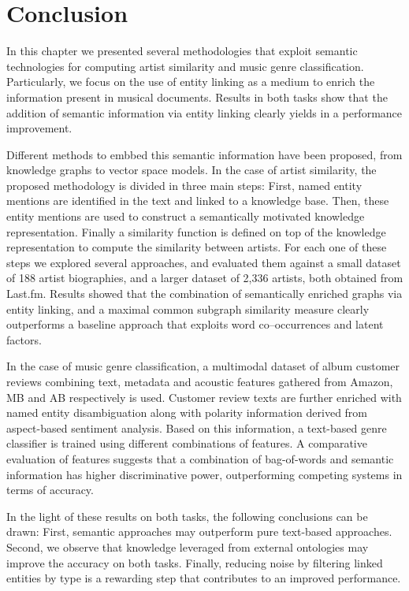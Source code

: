 \section{Conclusion}
\label{sec:similarity:conclusion}

In this chapter we presented several methodologies that exploit semantic technologies for computing artist similarity and music genre classification. Particularly, we focus on the use of entity linking as a medium to enrich the information present in musical documents. Results in both tasks show that the addition of semantic information via entity linking clearly yields in a performance improvement.

Different methods to embbed this semantic information have been proposed, from knowledge graphs to vector space models.
In the case of artist similarity, the proposed methodology is divided in three main steps: First, named entity mentions are identified in the text and linked to a knowledge base. Then, these entity mentions are used to construct a semantically motivated knowledge representation. Finally a similarity function is defined on top of the knowledge representation to compute the similarity between artists.
For each one of these steps we explored several approaches, and evaluated them against a small dataset of 188 artist biographies, and a larger dataset of 2,336 artists, both obtained from Last.fm.
Results showed that the combination of semantically enriched graphs via entity linking, and a maximal common subgraph similarity measure clearly outperforms a baseline approach that exploits word co--occurrences and latent factors.

In the case of music genre classification, a multimodal dataset of album customer reviews combining text, metadata and acoustic features gathered from Amazon, MB and AB respectively is used. Customer review texts are further enriched with named entity disambiguation along with polarity information derived from aspect-based sentiment analysis. Based on this information, a text-based genre classifier is trained using different combinations of features. 
A comparative evaluation of features suggests that a combination of bag-of-words and semantic information has higher discriminative power, outperforming competing systems in terms of accuracy.

In the light of these results on both tasks, the following conclusions can be drawn: First, semantic approaches may outperform pure text-based approaches. Second, we observe that knowledge leveraged from external ontologies may improve the accuracy on both tasks. Finally, reducing noise by filtering linked entities by type is a rewarding step that contributes to an improved performance.
